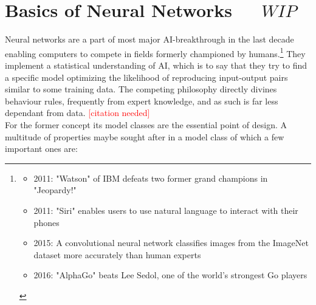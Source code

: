 \section{Basics of Neural Networks\ \ \  \(WIP\)}
Neural networks are a part of most major AI-breakthrough in the last decade enabling computers to compete in fields formerly championed by humans.\footnote{
	\begin{itemize}
		\item 
			2011: "Watson" of IBM defeats two former grand champions in "Jeopardy!" \cite{lally2011natural}
		\item 
			2011: "Siri" enables users to use natural language to interact with their phones 
			\cite{ARON201124}
		\item 
			2015: A convolutional neural network classifies images from the ImageNet dataset more accurately than human experts 
			\cite{Russakovsky2015} \cite{He_2015_ICCV}
		\item 
			2016: "AlphaGo" beats Lee Sedol, one of the world's strongest Go players
			\cite{gibney2016google} \cite{silver2017mastering}
	\end{itemize}
}
They implement a statistical understanding of AI, which is to say that they try to find a specific model optimizing the likelihood of reproducing input-output pairs similar to some training data. The competing philosophy directly divines behaviour rules, frequently from expert knowledge, and as such is far less dependant from data.  
\textcolor{red}{[citation needed]}\\
For the former concept its model classes are the essential point of design. A multitude of properties maybe sought after in a model class of which a few important ones are:
